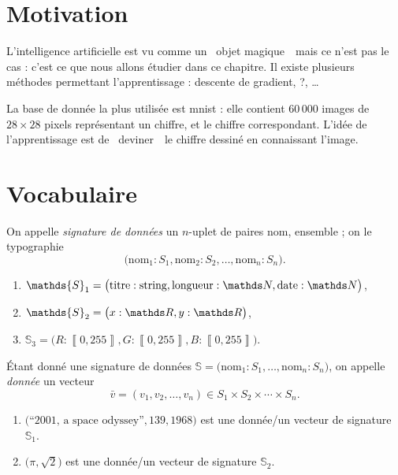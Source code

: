 \section{Motivation}

L'intelligence artificielle est vu comme un \guillemotleft~objet magique~\guillemotright\ mais ce n'est pas le cas : c'est ce que nous allons étudier dans ce chapitre.
Il existe plusieurs méthodes permettant l'apprentissage : descente de gradient, ?, \ldots

La base de donnée la plus utilisée est {\sc mnist}\/ : elle contient 60\,000 images de $28 \times 28$\/ pixels représentant un chiffre, et le chiffre correspondant.
L'idée de l'apprentissage est de \guillemotleft~deviner~\guillemotright\ le chiffre dessiné en connaissant l'image.

\section{Vocabulaire}

\begin{defn}
	On appelle {\it signature de données}\/ un $n$-uplet de paires nom, ensemble ; on le typographie \[
		\big(\text{nom}_1 : S_1, \text{nom}_2 : S_2, \ldots, \text{nom}_n : S_n\big)
	.\]
\end{defn}

\begin{exm}
	\begin{enumerate}
		\item $\mathds{S}_1 = \big(\text{titre} : \text{string}, \text{longueur} : \N, \text{date} : \N\big)$,
		\item $\mathds{S}_2 = \big(x : \R, y : \R\big)$,
		\item $\mathds{S}_3 = \big( R : \left\llbracket 0,255 \right\rrbracket, G : \left\llbracket 0, 255 \right\rrbracket, B : \left\llbracket 0,255 \right\rrbracket\big)$.
	\end{enumerate}
\end{exm}

\begin{defn}
	Étant donné une signature de données $\mathds{S} = \big(\text{nom}_1 : S_1, \ldots, \text{nom}_n : S_n\big)$, on appelle {\it donnée}\/ un vecteur \[
		\bar{v} = (v_1, v_2, \ldots, v_n) \in S_1 \times S_2 \times \cdots \times S_n
	.\]
\end{defn}

\begin{exm}
	\begin{enumerate}
		\item $\big(\text{``2001, a space odyssey''}, 139, 1968\big)$\/ est une donnée/un vecteur de signature~$\mathds{S}_1$.
		\item $\big(\pi, \sqrt{2}\big)$\/ est une donnée/un vecteur de signature $\mathds{S}_2$.
	\end{enumerate}
\end{exm}

